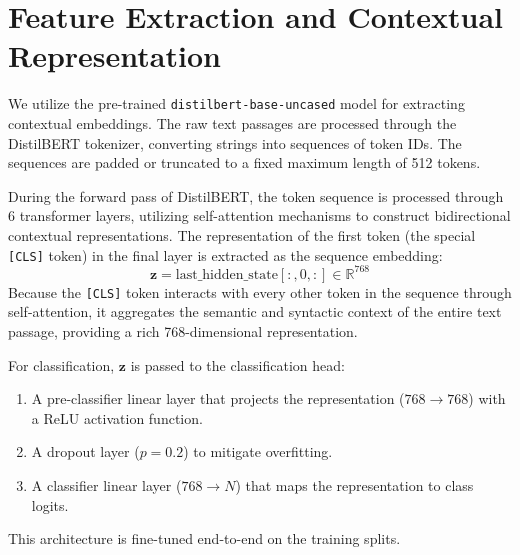 \begin{table}[h]
\centering
{}
\caption{Dataset partitions and sample sizes across Experiment 3 splits.}
\label{tab:dataset_splits}
\end{table}

\section{Feature Extraction and Contextual Representation}\label{Chapter-2-Features}
\noindent We utilize the pre-trained \texttt{distilbert-base-uncased} model \cite{sanh2019distilbert} for extracting contextual embeddings. The raw text passages are processed through the DistilBERT tokenizer, converting strings into sequences of token IDs. The sequences are padded or truncated to a fixed maximum length of 512 tokens.

During the forward pass of DistilBERT, the token sequence is processed through 6 transformer layers, utilizing self-attention mechanisms \cite{vaswani2017attention} to construct bidirectional contextual representations. The representation of the first token (the special \texttt{[CLS]} token) in the final layer is extracted as the sequence embedding:
$$\mathbf{z} = \text{last\_hidden\_state}[:, 0, :] \in \mathbb{R}^{768}$$
Because the \texttt{[CLS]} token interacts with every other token in the sequence through self-attention, it aggregates the semantic and syntactic context of the entire text passage, providing a rich 768-dimensional representation.

For classification, $\mathbf{z}$ is passed to the classification head:
\begin{enumerate}
    \item A pre-classifier linear layer that projects the representation ($768 \to 768$) with a ReLU activation function.
    \item A dropout layer ($p = 0.2$) to mitigate overfitting.
    \item A classifier linear layer ($768 \to N$) that maps the representation to class logits.
\end{enumerate}
This architecture is fine-tuned end-to-end on the training splits.

